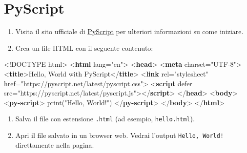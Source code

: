 \documentclass[
  letterpaper,
]{scrbook}
\newenvironment{Shaded}{\begin{snugshade}}{\end{snugshade}}
\newcommand{\DataTypeTok}[1]{\textcolor[rgb]{0.68,0.00,0.00}{#1}}
\newcommand{\KeywordTok}[1]{\textcolor[rgb]{0.00,0.23,0.31}{\textbf{#1}}}
\newcommand{\NormalTok}[1]{\textcolor[rgb]{0.00,0.23,0.31}{#1}}
\newcommand{\OperatorTok}[1]{\textcolor[rgb]{0.37,0.37,0.37}{#1}}
\newcommand{\OtherTok}[1]{\textcolor[rgb]{0.00,0.23,0.31}{#1}}
\newcommand{\StringTok}[1]{\textcolor[rgb]{0.13,0.47,0.30}{#1}}
\begin{document}
\section{PyScript}

\begin{enumerate}
\def\labelenumi{\arabic{enumi}.}
\item
  Visita il sito ufficiale di \href{https://pyscript.net/}{PyScript} per
  ulteriori informazioni su come iniziare.
\item
  Crea un file HTML con il seguente contenuto:
\end{enumerate}

\begin{Shaded}
\begin{Highlighting}[]
\DataTypeTok{\textless{}!DOCTYPE}\NormalTok{ html}\DataTypeTok{\textgreater{}}
\DataTypeTok{\textless{}}\KeywordTok{html}\OtherTok{ lang}\OperatorTok{=}\StringTok{"en"}\DataTypeTok{\textgreater{}}
\DataTypeTok{\textless{}}\KeywordTok{head}\DataTypeTok{\textgreater{}}
    \DataTypeTok{\textless{}}\KeywordTok{meta}\OtherTok{ charset}\OperatorTok{=}\StringTok{"UTF{-}8"}\DataTypeTok{\textgreater{}}
    \DataTypeTok{\textless{}}\KeywordTok{title}\DataTypeTok{\textgreater{}}\NormalTok{Hello, World with PyScript}\DataTypeTok{\textless{}/}\KeywordTok{title}\DataTypeTok{\textgreater{}}
    \DataTypeTok{\textless{}}\KeywordTok{link}\OtherTok{ rel}\OperatorTok{=}\StringTok{"stylesheet"}\OtherTok{ href}\OperatorTok{=}\StringTok{"https://pyscript.net/latest/pyscript.css"}\DataTypeTok{\textgreater{}}
    \DataTypeTok{\textless{}}\KeywordTok{script}\OtherTok{ defer src}\OperatorTok{=}\StringTok{"https://pyscript.net/latest/pyscript.js"}\DataTypeTok{\textgreater{}\textless{}/}\KeywordTok{script}\DataTypeTok{\textgreater{}}
\DataTypeTok{\textless{}/}\KeywordTok{head}\DataTypeTok{\textgreater{}}
\DataTypeTok{\textless{}}\KeywordTok{body}\DataTypeTok{\textgreater{}}
    \DataTypeTok{\textless{}}\KeywordTok{py{-}script}\DataTypeTok{\textgreater{}}
\NormalTok{        print("Hello, World!")}
    \DataTypeTok{\textless{}/}\KeywordTok{py{-}script}\DataTypeTok{\textgreater{}}
\DataTypeTok{\textless{}/}\KeywordTok{body}\DataTypeTok{\textgreater{}}
\DataTypeTok{\textless{}/}\KeywordTok{html}\DataTypeTok{\textgreater{}}
\end{Highlighting}
\end{Shaded}

\begin{enumerate}
\def\labelenumi{\arabic{enumi}.}
\setcounter{enumi}{3}
\item
  Salva il file con estensione \texttt{.html} (ad esempio,
  \texttt{hello.html}).
\item
  Apri il file salvato in un browser web. Vedrai l'output
  \texttt{Hello,\ World!} direttamente nella pagina.
\end{enumerate}
\end{document}
